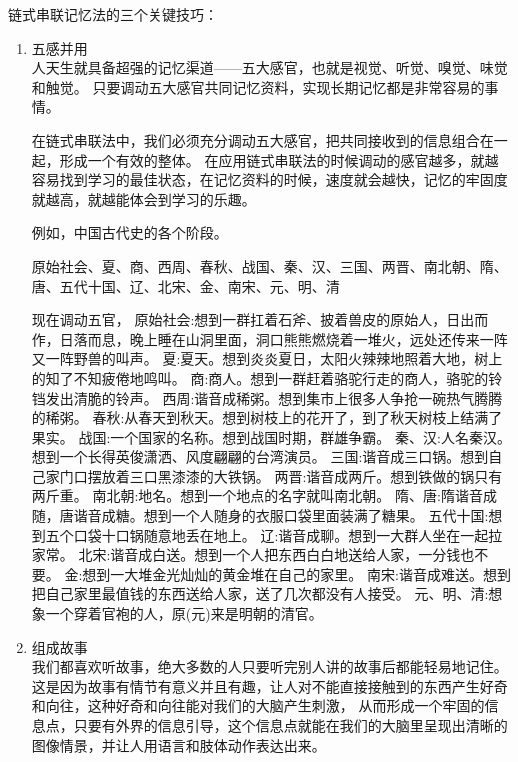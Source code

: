链式串联记忆法的三个关键技巧：
\begin{enumerate}
\item 五感并用\\
  人天生就具备超强的记忆渠道——五大感官，也就是视觉、听觉、嗅觉、味觉和触觉。
  只要调动五大感官共同记忆资料，实现长期记忆都是非常容易的事情。

  在链式串联法中，我们必须充分调动五大感官，把共同接收到的信息组合在一起，形成一个有效的整体。
  在应用链式串联法的时候调动的感官越多，就越容易找到学习的最佳状态，在记忆资料的时候，速度就会越快，记忆的牢固度就越高，就越能体会到学习的乐趣。

  例如，中国古代史的各个阶段。
  \begin{tcolorbox}
    原始社会、夏、商、西周、春秋、战国、秦、汉、三国、两晋、南北朝、隋、唐、五代十国、辽、北宋、金、南宋、元、明、清
  \end{tcolorbox}
  现在调动五官，
  原始社会:想到一群扛着石斧、披着兽皮的原始人，日出而作，日落而息，晚上睡在山洞里面，洞口熊熊燃烧着一堆火，远处还传来一阵又一阵野兽的叫声。
  夏:夏天。想到炎炎夏日，太阳火辣辣地照着大地，树上的知了不知疲倦地鸣叫。
  商:商人。想到一群赶着骆驼行走的商人，骆驼的铃铛发出清脆的铃声。
  西周:谐音成稀粥。想到集市上很多人争抢一碗热气腾腾的稀粥。
  春秋:从春天到秋天。想到树枝上的花开了，到了秋天树枝上结满了果实。
  战国:一个国家的名称。想到战国时期，群雄争霸。
  秦、汉:人名秦汉。想到一个长得英俊潇洒、风度翩翩的台湾演员。
  三国:谐音成三口锅。想到自己家门口摆放着三口黑漆漆的大铁锅。
  两晋:谐音成两斤。想到铁做的锅只有两斤重。
  南北朝:地名。想到一个地点的名字就叫南北朝。
  隋、唐:隋谐音成随，唐谐音成糖。想到一个人随身的衣服口袋里面装满了糖果。
  五代十国:想到五个口袋十口锅随意地丢在地上。
  辽:谐音成聊。想到一大群人坐在一起拉家常。
  北宋:谐音成白送。想到一个人把东西白白地送给人家，一分钱也不要。
  金:想到一大堆金光灿灿的黄金堆在自己的家里。
  南宋:谐音成难送。想到把自己家里最值钱的东西送给人家，送了几次都没有人接受。
  元、明、清:想象一个穿着官袍的人，原(元)来是明朝的清官。
\item 组成故事\\
  我们都喜欢听故事，绝大多数的人只要听完别人讲的故事后都能轻易地记住。
  这是因为故事有情节有意义并且有趣，让人对不能直接接触到的东西产生好奇和向往，这种好奇和向往能对我们的大脑产生刺激， 从而形成一个牢固的信息点，只要有外界的信息引导，这个信息点就能在我们的大脑里呈现出清晰的图像情景，并让人用语言和肢体动作表达出来。



\end{enumerate}
